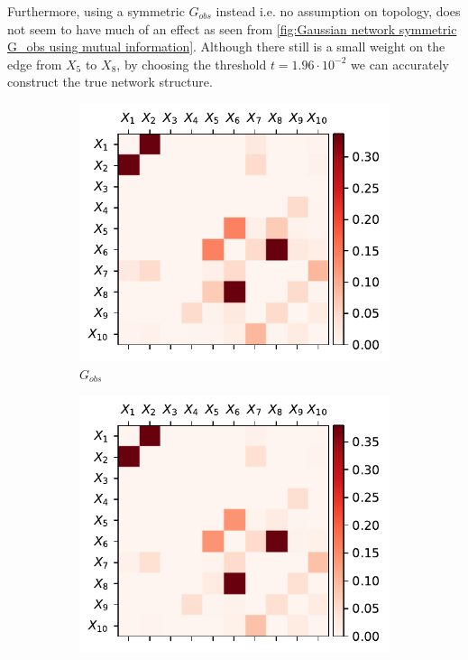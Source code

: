 \documentclass[../Thesis.tex]{subfiles}
\begin{document}
Furthermore, using a symmetric $G_{obs}$ instead i.e. no assumption on topology, does not seem to have much of an effect as seen from \autoref{fig:Gaussian network symmetric G_obs using mutual information}. Although there still is a small weight on the edge from $X_5$ to $X_8$, by choosing the threshold $t = 1.96 \cdot 10^{-2}$ we can accurately construct the true network structure.
\begin{figure}[h]
    \centering
    \begin{subfigure}[t]{0.49\textwidth}
        \centering
        \includegraphics[width=.95\linewidth]{figures/Gaussian Network Theoretical/symmetric G obs - MI.pdf}
        \caption{$G_{obs}$}
    \end{subfigure}
    \hfill
    \begin{subfigure}[t]{0.49\textwidth}
        \centering
        \includegraphics[width=.95\linewidth]{figures/Gaussian Network Theoretical/G dir from symmetric G obs - MI.pdf}

\end{subfigure}
\end{figure}
\end{document}
